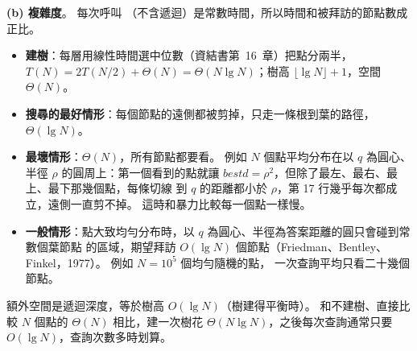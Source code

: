 \begin{pastsoln}
\textbf{(b) 複雜度}。 每次呼叫 （不含遞迴）是常數時間，所以時間和被拜訪的節點數成正比。
\begin{itemize}
\item \textbf{建樹}：每層用線性時間選中位數（資結書第~16~章）把點分兩半，
$T(N) = 2T(N/2) + \Theta(N) = \Theta(N \lg N)$；樹高 $\lfloor \lg N \rfloor + 1$，空間 $\Theta(N)$。
\item \textbf{搜尋的最好情形}：每個節點的遠側都被剪掉，只走一條根到葉的路徑，$\Theta(\lg N)$。
\item \textbf{最壞情形}：$\Theta(N)$，所有節點都要看。 例如 $N$ 個點平均分布在以 $q$ 為圓心、半徑 $\rho$
的圓周上：第一個看到的點就讓 $\mathit{bestd} = \rho^2$，但除了最左、最右、最上、最下那幾個點，每條切線
到 $q$ 的距離都小於 $\rho$，第 17 行幾乎每次都成立，遠側一直剪不掉。 這時和暴力比較每一個點一樣慢。
\item \textbf{一般情形}：點大致均勻分布時，以 $q$ 為圓心、半徑為答案距離的圓只會碰到常數個葉節點
的區域，期望拜訪 $O(\lg N)$ 個節點（Friedman、Bentley、Finkel，1977）。 例如 $N = 10^5$ 個均勻隨機的點，
一次查詢平均只看二十幾個節點。
\end{itemize}
額外空間是遞迴深度，等於樹高 $O(\lg N)$（樹建得平衡時）。 和不建樹、直接比較 $N$ 個點的 $\Theta(N)$
相比，建一次樹花 $\Theta(N \lg N)$，之後每次查詢通常只要 $O(\lg N)$，查詢次數多時划算。
\end{pastsoln}
